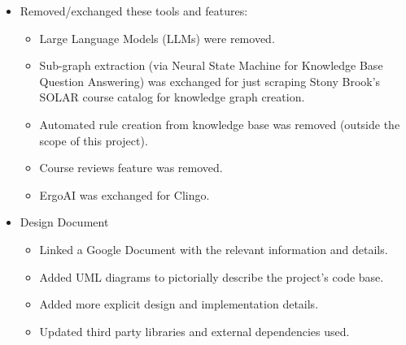 \documentclass[12pt]{article}
\begin{document}
    \begin{itemize}
        \item Removed/exchanged these tools and features:
        \begin{itemize}
            \item Large Language Models (LLMs) were removed.
            \item Sub-graph extraction (via Neural State Machine for Knowledge Base Question Answering) was exchanged for just scraping Stony Brook's SOLAR course catalog for knowledge graph creation.
            \item Automated rule creation from knowledge base was removed (outside the scope of this project).
            \item Course reviews feature was removed.
            \item ErgoAI was exchanged for Clingo.
        \end{itemize}
        \item Design Document
        \begin{itemize}
            \item Linked a Google Document with the relevant information and details.
            \item Added UML diagrams to pictorially describe the project's code base.
            \item Added more explicit design and implementation details.
            \item Updated third party libraries and external dependencies used.
        \end{itemize}
    \end{itemize}
\end{document}
